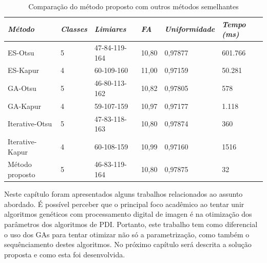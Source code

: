 \documentclass[12pt,oneside,a4paper,english,french,spanish,brazil,]{abntex2}
\begin{document}
\begin{table}
\centering
\caption{Comparação do método proposto com outros métodos semelhantes}
\label{tab:TrCo_Bammouche_Resultados}
\begin{tabular}{llllll}
\hline
\textit{\textbf{\small{Método}}} & \textit{\textbf{\small{Classes}}} & \textit{\textbf{\small{Limiares}}} & \textit{\textbf{\small{FA}}} & \textit{\textbf{\small{Uniformidade}}} & \textit{\textbf{\small{Tempo (ms)}}} \\ \hline
ES-Otsu                  & 5                                   & 47-84-119-164                          & 10,80                           & 0,97877                        & 601.766                             \\
ES-Kapur                 & 4                                   & 60-109-160                             & 11,00                           & 0,97159                        & 50.281                              \\
GA-Otsu                  & 5                                   & 46-80-113-162                          & 10,82                           & 0,97805                        & 578                                 \\
GA-Kapur                 & 4                                   & 59-107-159                             & 10,97                           & 0,97177                        & 1.118                               \\
Iterative-Otsu           & 5                                   & 47-83-118-163                          & 10,80                           & 0,97874                        & 360                                 \\
Iterative-Kapur          & 4                                   & 60-108-159                             & 10,99                           & 0,97160                        & 1516                                \\
Método proposto          & 5                                   & 46-83-119-164                          & 10,80                           & 0,97875                        & 32                                  \\ \hline
\end{tabular}
\end{table}

Neste capítulo foram apresentados alguns trabalhos relacionados ao assunto abordado. É possível perceber que o principal foco acadêmico ao tentar unir algoritmos genéticos com processamento digital de imagen é na otimização dos parâmetros dos algoritmos de PDI. Portanto, este trabalho tem como diferencial o uso dos GAs para tentar otimizar não só a parametrização, como também o sequênciamento destes algoritmos. No próximo capítulo será descrita a solução proposta e como esta foi desenvolvida.
\end{document}

